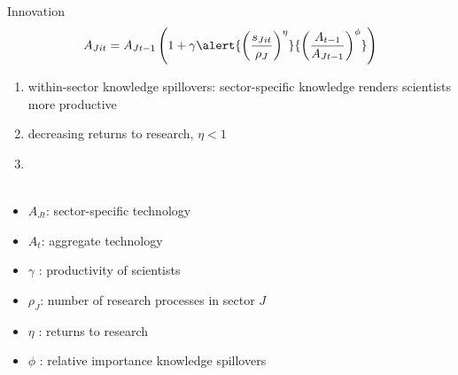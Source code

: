 \documentclass[11pt,aspectratio=169]{beamer}
\begin{document}
\addtocounter{framenumber}{-1}
\begin{frame}{Innovation}
	\vspace{-5mm}
	\large
	\begin{align*}
		A_{Jit}={A_{Jt-1}}\left(1+\gamma\alert{\left(\frac{s_{Jit}}{\rho_J}\right)^{\eta}}{\left(\frac{A_{t-1}}{A_{Jt-1}}\right)^\phi}\right)
	\end{align*}
	\normalsize
	\begin{enumerate}
		\item within-sector knowledge spillovers: sector-specific knowledge renders scientists more productive
		\item \alert{decreasing returns to research, $\eta<1$}
		\item[] \ \\ \  %
	\end{enumerate}
	\small
	\vspace{4mm}
	\hspace{-2mm}
	\begin{minipage}[t!]{0.43\textwidth}
		\vspace{0mm}
		\begin{itemize}
			\item[] $A_{Jt}$: sector-specific technology
			\vspace{-2mm}		
			\item[] $A_t$: aggregate technology
			\vspace{-2mm}
			\item[] $\gamma$ : productivity of scientists
		\end{itemize}
	\end{minipage}
	\vspace{-5mm}
	\begin{minipage}[t!]{0.55\textwidth}
		\vspace{0mm}
		\begin{itemize}	
			\item[] \alert{$\rho_J$: number of research processes in sector $J$}
			\vspace{-2mm}			
			\item[] $\eta$ : returns to research
			\vspace{-2mm}			
			\item[] $\phi$ : relative importance knowledge spillovers
		\end{itemize}
	\end{minipage}
\end{frame}
\end{document}
